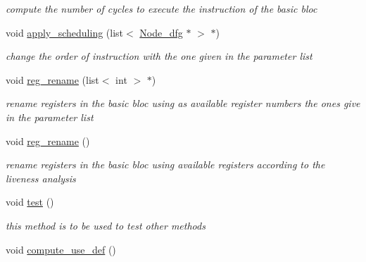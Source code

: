 \begin{DoxyCompactItemize}
\begin{DoxyCompactList}\small\item\em compute the number of cycles to execute the instruction of the basic bloc \end{DoxyCompactList}\item 
void \hyperlink{class_basic__block_a2dd5a0cf5a891f5626cd7b34849ea081}{apply\+\_\+scheduling} (list$<$ \hyperlink{class_node__dfg}{Node\+\_\+dfg} $\ast$ $>$ $\ast$)
\begin{DoxyCompactList}\small\item\em change the order of instruction with the one given in the parameter list \end{DoxyCompactList}\item 
\hypertarget{class_basic__block_a800a558f4a20dfbd8528608b0fca3854}{}void \hyperlink{class_basic__block_a800a558f4a20dfbd8528608b0fca3854}{reg\+\_\+rename} (list$<$ int $>$ $\ast$)\label{class_basic__block_a800a558f4a20dfbd8528608b0fca3854}

\begin{DoxyCompactList}\small\item\em rename registers in the basic bloc using as available register numbers the ones give in the parameter list \end{DoxyCompactList}\item 
\hypertarget{class_basic__block_a1b6570f1c03c7f7435ab681c243151c9}{}void \hyperlink{class_basic__block_a1b6570f1c03c7f7435ab681c243151c9}{reg\+\_\+rename} ()\label{class_basic__block_a1b6570f1c03c7f7435ab681c243151c9}

\begin{DoxyCompactList}\small\item\em rename registers in the basic bloc using available registers according to the liveness analysis \end{DoxyCompactList}\item 
\hypertarget{class_basic__block_a0f26ff105216c62082905097b5dcebd3}{}void \hyperlink{class_basic__block_a0f26ff105216c62082905097b5dcebd3}{test} ()\label{class_basic__block_a0f26ff105216c62082905097b5dcebd3}

\begin{DoxyCompactList}\small\item\em this method is to be used to test other methods \end{DoxyCompactList}\item 
\hypertarget{class_basic__block_a7e91d5003b7941c50199ab22a8db0d17}{}void \hyperlink{class_basic__block_a7e91d5003b7941c50199ab22a8db0d17}{compute\+\_\+use\+\_\+def} ()\label{class_basic__block_a7e91d5003b7941c50199ab22a8db0d17}


\end{DoxyCompactItemize}
